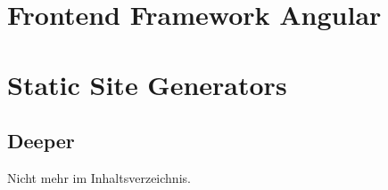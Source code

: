 \section{Frontend Framework Angular}

\section{Static Site Generators}

\subsection{Deeper}
Nicht mehr im Inhaltsverzeichnis.

